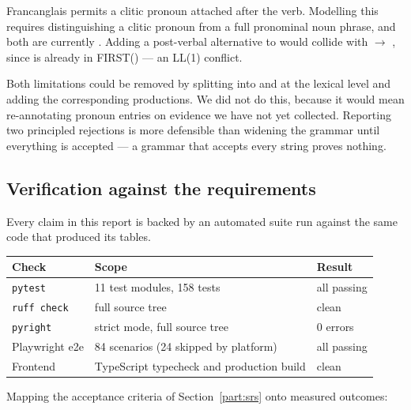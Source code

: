 Francanglais permits a clitic pronoun attached after the verb. Modelling this requires
distinguishing a clitic pronoun from a full pronominal noun phrase, and both are currently
. Adding a post-verbal  alternative to  would collide
with  $\rightarrow$  , since  is
already in FIRST() --- an LL(1) conflict.

\begin{limitbox}
Both limitations could be removed by splitting  into  and
 at the lexical level and adding the corresponding productions. We did not do
this, because it would mean re-annotating pronoun entries on evidence we have not yet
collected. Reporting two principled rejections is more defensible than widening the
grammar until everything is accepted --- a grammar that accepts every string proves nothing.
\end{limitbox}

\subsection{Verification against the requirements}\label{sec:verification}

Every claim in this report is backed by an automated suite run against the same code that
produced its tables.

\begin{center}
\small
\begin{tabular}{@{}l l l@{}}
\toprule
\textbf{Check} & \textbf{Scope} & \textbf{Result} \\
\midrule
\texttt{pytest}       & 11 test modules, 158 tests            & all passing \\
\texttt{ruff check}   & full source tree                      & clean \\
\texttt{pyright}      & strict mode, full source tree         & 0 errors \\
Playwright e2e        & 84 scenarios (24 skipped by platform) & all passing \\
Frontend              & TypeScript typecheck and production build & clean \\
\bottomrule
\end{tabular}
\end{center}

Mapping the acceptance criteria of Section~\ref{part:srs} onto measured outcomes:

